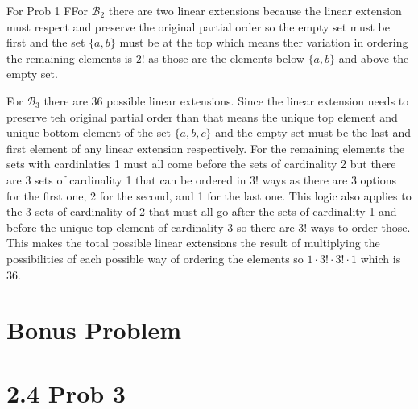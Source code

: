 \documentclass{report}
\begin{document}
\begin{RemarkWithLily}{For Prob 1}
  FFor $\mathcal{B}_2$ there are two linear extensions because the linear extension must respect and preserve the original partial order 
  so the empty set must be first and the set $\{a,b\}$ must be at the top which means ther variation in ordering the remaining elements is $2!$ as those are the elements below 
  $\{a,b\}$ and above the empty set. 

  \medskip

  For $\mathcal{B}_{3}$ there are 36 possible linear extensions. Since the linear extension needs to preserve teh original 
  partial order than that means the unique top element and unique bottom element of the set $\{a,b,c\}$ and the empty set must be the last and first 
  element of any linear extension respectively. For the remaining elements the sets with cardinlaties 1 must all come before the sets of cardinality 2 
  but there are $3$ sets of cardinality 1 that can be ordered in $3!$ ways as there are 3 options for the first one, 2 for the second, and 1 for the last one. 
  This logic also applies to the 3 sets of cardinality of 2 that must all go after the sets of cardinality 1 and before the unique top element of 
  cardinality 3 so there are $3!$ ways to order those. This makes the total possible linear extensions the result of 
  multiplying the possibilities of each possible way of ordering the elements so $1 \cdot 3! \cdot 3! \cdot 1$ which is $36$. 
\end{RemarkWithLily}




\section*{Bonus Problem}


\section*{2.4 Prob 3}

\end{document}
